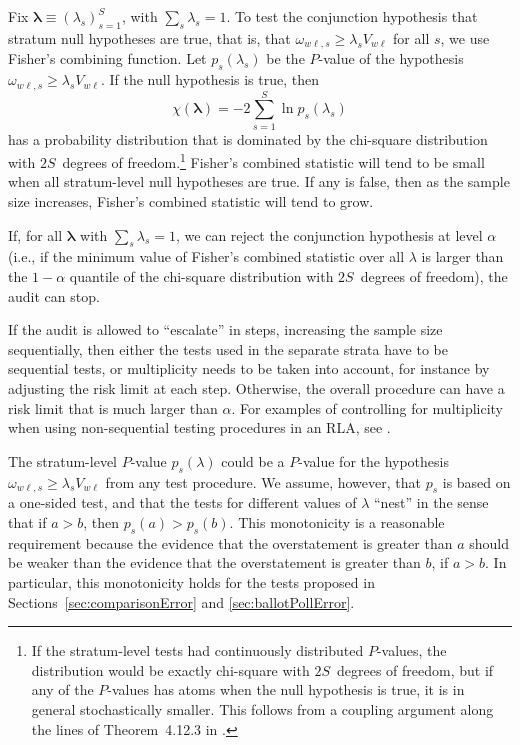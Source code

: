 \documentclass[runningheads]{llncs}
\newcommand{\beq}{\begin{equation}}
\newcommand{\eeq}{\end{equation}}
\begin{document}
Fix $\mathbf{\lambda} \equiv (\lambda_s)_{s=1}^S$, with $\sum_s \lambda_s = 1$.
To test the conjunction hypothesis that stratum null hypotheses are true, that is, that $\omega_{w\ell,s} \ge \lambda_s V_{w\ell}$ for all $s$, we use Fisher's combining function.
Let $p_s(\lambda_s)$ be the $P$-value of the hypothesis $\omega_{w\ell,s} \ge \lambda_s V_{w\ell}$.
If the null hypothesis is true, then 
\beq \label{eq:fisher}
   \chi(\mathbf{\lambda}) = -2 \sum_{s=1}^S \ln p_s(\lambda_s)
\eeq
has a probability distribution that is dominated by the chi-square distribution with $2S$~degrees
of freedom.\footnote{%
   If the stratum-level tests had continuously distributed $P$-values, the distribution would be exactly
   chi-square with $2S$~degrees of freedom, but if any of the $P$-values has atoms when
   the null hypothesis is true, it is in general stochastically smaller.
   This follows from a coupling argument along the lines of Theorem~4.12.3 in \cite{grimmett01}.
}
Fisher's combined statistic will tend to be small when all stratum-level null hypotheses are true.
If any is false, then as the sample size increases, Fisher's combined statistic will tend to grow.

If, for all $\mathbf{\lambda}$ with $\sum_s \lambda_s = 1$, we can reject the conjunction
hypothesis at level $\alpha$ 
(i.e., if the minimum value of Fisher's combined statistic over all $\lambda$ is larger than the $1-\alpha$ quantile of the chi-square
distribution with $2S$~degrees of freedom), the audit can stop. 

If the audit is allowed to ``escalate'' in steps, increasing the sample size sequentially, then either the tests used in the separate strata have to be sequential tests, or multiplicity needs to be taken into account, for instance by adjusting the risk limit at each step.
Otherwise, the overall procedure can have a risk limit that is much larger than $\alpha$.
For examples of controlling for multiplicity when using non-sequential testing procedures in an RLA, see \cite{stark08a,stark09a}.

The stratum-level $P$-value $p_s(\lambda)$ could be a $P$-value for the hypothesis
$\omega_{w\ell,s} \ge \lambda_s V_{w\ell}$ from any test procedure. 
We assume, however, that $p_s$ is based on a one-sided test, and that the tests
for different values of $\lambda$ ``nest'' in the sense that if $a > b$,
then $p_s(a) > p_s(b)$.
This monotonicity is a reasonable requirement because the evidence that the overstatement
is greater than $a$ should be weaker than the evidence that the overstatement is greater than
$b$, if $a > b$.
In particular, this monotonicity holds for the tests proposed in Sections~\ref{sec:comparisonError}
and \ref{sec:ballotPollError}.
\end{document}
